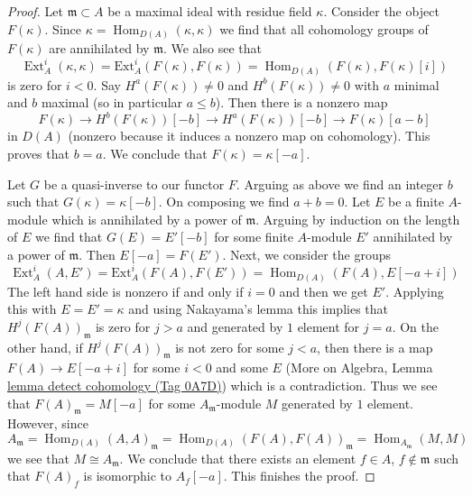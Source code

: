\documentclass{amsart}
\theoremstyle{plain}
\theoremstyle{definition}
\theoremstyle{remark}
\numberwithin{equation}{subsection}
\def\Hom{\mathop{\mathrm{Hom}}\nolimits}
\def\Ext{\mathop{\mathrm{Ext}}\nolimits}
\begin{document}
\begin{proof}
Let $\mathfrak m \subset A$ be a maximal ideal with residue field $\kappa$.
Consider the object $F(\kappa)$. Since
$\kappa = \Hom_{D(A)}(\kappa, \kappa)$ we find that all
cohomology groups of $F(\kappa)$ are annihilated by $\mathfrak m$.
We also see that
$$
\Ext^i_A(\kappa, \kappa) = \text{Ext}^i_A(F(\kappa), F(\kappa))
= \Hom_{D(A)}(F(\kappa), F(\kappa)[i])
$$
is zero for $i < 0$. Say $H^a(F(\kappa)) \not = 0$ and
$H^b(F(\kappa)) \not = 0$ with $a$ minimal and $b$ maximal
(so in particular $a \leq b$). Then there is a nonzero map
$$
F(\kappa) \to H^b(F(\kappa))[-b] \to H^a(F(\kappa))[-b]
\to F(\kappa)[a - b]
$$
in $D(A)$ (nonzero because it induces a nonzero map on cohomology).
This proves that $b = a$. We conclude that $F(\kappa) = \kappa[-a]$.

\medskip\noindent
Let $G$ be a quasi-inverse to our functor $F$. Arguing as above
we find an integer $b$ such that $G(\kappa) = \kappa[-b]$.
On composing we find $a + b = 0$. Let $E$ be a finite $A$-module
which is annihilated by a power of $\mathfrak m$. Arguing by
induction on the length of $E$ we find that $G(E) = E'[-b]$
for some finite $A$-module $E'$ annihilated by a power of
$\mathfrak m$. Then $E[-a] = F(E')$.
Next, we consider the groups
$$
\Ext^i_A(A, E') = \text{Ext}^i_A(F(A), F(E')) =
\Hom_{D(A)}(F(A), E[-a + i])
$$
The left hand side is nonzero if and only if $i = 0$ and then
we get $E'$. Applying this with $E = E' = \kappa$ and using Nakayama's
lemma this implies that $H^j(F(A))_\mathfrak m$ is zero for $j > a$ and
generated by $1$ element for $j = a$. On the other hand, if
$H^j(F(A))_\mathfrak m$ is not zero for some $j < a$, then
there is a map $F(A) \to E[-a + i]$ for some $i < 0$ and some
$E$ (More on Algebra, Lemma \href{https://stacks.math.columbia.edu/tag/0A7D}{lemma detect cohomology (Tag 0A7D)})
which is a contradiction.
Thus we see that $F(A)_\mathfrak m = M[-a]$
for some $A_\mathfrak m$-module $M$ generated by $1$ element.
However, since
$$
A_\mathfrak m = \Hom_{D(A)}(A, A)_\mathfrak m =
\Hom_{D(A)}(F(A), F(A))_\mathfrak m = \Hom_{A_\mathfrak m}(M, M)
$$
we see that $M \cong A_\mathfrak m$. We conclude that there exists
an element $f \in A$, $f \not \in \mathfrak m$ such that
$F(A)_f$ is isomorphic to $A_f[-a]$. This finishes the proof.
\end{proof}
\end{document}
